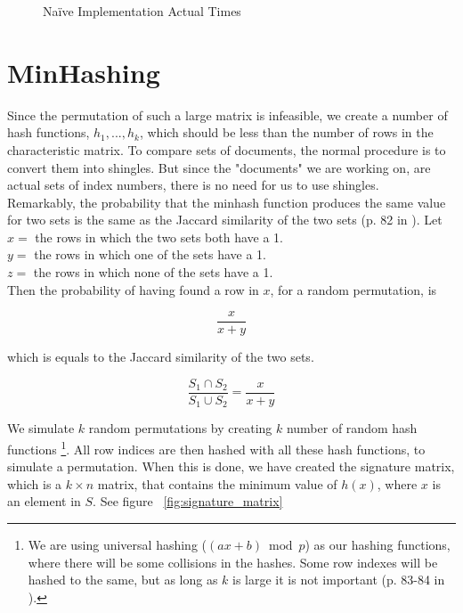 \documentclass[a4paper,11pt]{article}
\begin{document}
\begin{figure}[!htbp]
    \begin{center}
        
        \caption{Naïve Implementation Actual Times}
        \label{fig:naive_at}
    \end{center}
\end{figure}


\section{MinHashing}\label{sec:minhashing}
Since the permutation of such a large matrix is infeasible, we create a number of hash functions, $h_1, ..., h_k$, which should be less than the number of rows in the characteristic matrix. To compare sets of documents, the normal procedure is to convert them into shingles. But since the "documents" we are working on, are actual sets of index numbers, there is no need for us to use shingles. \\

Remarkably, the probability that the minhash function produces the same value for two sets is the same as the Jaccard similarity of the two sets (p. 82 in \cite{book:mmds}). Let \\

    $x = $ the rows in which the two sets both have a 1. \\
    $y = $ the rows in which one of the sets have a 1. \\
    $z = $ the rows in which none of the sets have a 1. \\

Then the probability of having found a row in $x$, for a random permutation, is

\begin{equation*}
    \frac{x}{x+y}
\end{equation*}

which is equals to the Jaccard similarity of the two sets.

\begin{equation*}
    \frac{S_1 \cap S_2}{S_1 \cup S_2} = \frac{x}{x+y}
\end{equation*}
    
We simulate $k$ random permutations by creating $k$ number of random hash functions \footnote{We are using universal hashing ($(ax + b) \bmod p$) as our hashing functions, where there will be some collisions in the hashes. Some row indexes will be hashed to the same, but as long as $k$ is large it is not important (p. 83-84 in \cite{book:mmds}).}. All row indices are then hashed with all these hash functions, to simulate a permutation. When this is done, we have created the signature matrix, which is a $k\times n$ matrix, that contains the minimum value of $h(x)$, where $x$ is an element in $S$. See figure ~\ref{fig:signature_matrix}\\
\end{document}
